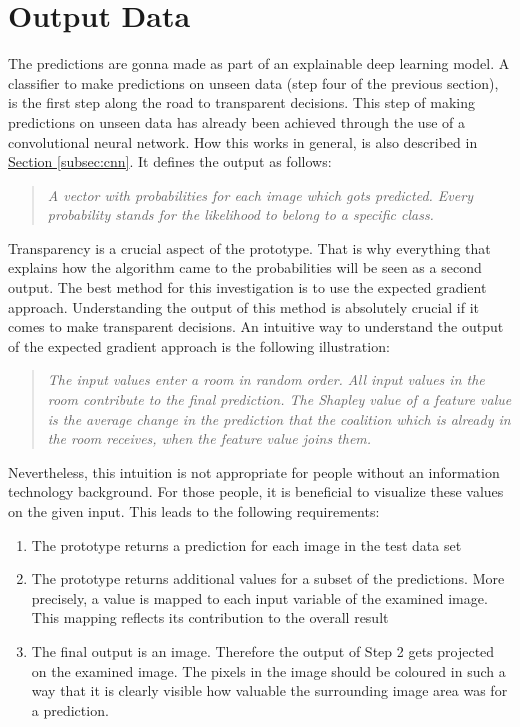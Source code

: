 \section{Output Data}

The predictions are gonna made as part of an explainable deep learning model. A classifier to make predictions on unseen data (step four of the previous section), is the first step along the road to transparent decisions. This step of making predictions on unseen data has already been achieved through the use of a convolutional neural network. How this works in general, is also described in \hyperref[subsec:cnn]{Section \ref{subsec:cnn}}. It defines the output as follows:

\begin{quote}
	\textit{A vector with probabilities for each image which gots predicted. Every probability stands for the likelihood to belong to a specific class.}
\end{quote}

Transparency is a crucial aspect of the prototype. That is why everything that explains how the algorithm came to the probabilities will be seen as a second output. The best method for this investigation is to use the expected gradient approach. Understanding the output of this method is absolutely crucial if it comes to make transparent decisions. An intuitive way to understand the output of the expected gradient approach is the following illustration: 

\begin{quote}
	\textit{The input values enter a room in random order. All input values in the room contribute to the final prediction. The Shapley value of a feature value is the average change in the prediction that the coalition which is already in the room receives, when the feature value joins them.}
\end{quote}

Nevertheless, this intuition is not appropriate for people without an information technology background. For those people, it is beneficial to visualize these values on the given input. This leads to the following requirements:

\begin{enumerate}
	\item The prototype returns a prediction for each image in the test data set 
	\item The prototype returns additional values for a subset of the predictions. More precisely, a value is mapped to each input variable of the examined image. This mapping reflects its contribution to the overall result
	\item The final output is an image. Therefore the output of Step 2 gets projected on the examined image. The pixels in the image should be coloured in such a way that it is clearly visible how valuable the surrounding image area was for a prediction.
\end{enumerate}

